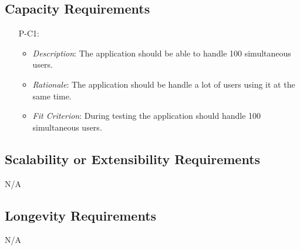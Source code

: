 \documentclass[12pt]{article}
\begin{document}
\subsection{Capacity Requirements}
\noindent \begin{itemize}
    \item[P-C1:] 
        \begin{itemize}
            \item \textit{Description}: The application should be able to handle 100 simultaneous users.
            \item \textit{Rationale}: The application should be handle a lot of users using it at the same time.
            \item \textit{Fit Criterion}: During testing the application should handle 100 simultaneous users.
        \end{itemize}
\end{itemize}
\subsection{Scalability or Extensibility Requirements}

N/A

\subsection{Longevity Requirements}

N/A

\end{document}
